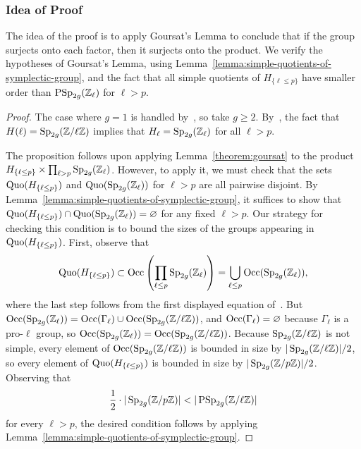 \subsubsection*{Idea of Proof}
The idea of the proof is to apply Goursat's Lemma to conclude that if the group surjects onto each factor,
then it surjects onto the product.
We verify the hypotheses of Goursat's Lemma,
using Lemma~\ref{lemma:simple-quotients-of-symplectic-group}, and the fact that all simple quotients of $H_{\{\ell \leq p\}}$
have smaller order than $\operatorname{PSp}_{2g}(\mathbb Z_\ell)$ for $\ell > p$.
	\begin{proof}
		The case where $g = 1$ is handled by~\cite[Lemma 7.6]{zywina2010hilbert}, so take $g \geq 2$. By~\cite[Theorem 1]{landesman-swaminathan-tao-xu:lifting-symplectic-group}, the fact that $H(\ell) = \operatorname{Sp}_{2g}(\mathbb Z/ \ell \mathbb Z)$ implies that $H_\ell = \operatorname{Sp}_{2g}(\mathbb Z_\ell)$ for all $\ell > p$.

  The proposition follows upon applying Lemma~\ref{theorem:goursat} to the product $H_{\{\ell \le p\}} \times \prod_{\ell > p} \operatorname{Sp}_{2g}(\mathbb Z_\ell)$. However, to apply it, we must check that the sets $\operatorname{Quo}(H_{\{\ell \le p\}})$ and $\operatorname{Quo}(\operatorname{Sp}_{2g}(\mathbb Z_\ell))$ for $\ell > p$ are all pairwise disjoint. By Lemma~\ref{lemma:simple-quotients-of-symplectic-group}, it suffices to show that $\operatorname{Quo}(H_{\{\ell \le p\}}) \cap \operatorname{Quo}(\operatorname{Sp}_{2g}(\mathbb Z_\ell)) = \varnothing$ for any fixed $\ell > p$. Our strategy for checking this condition is to bound the sizes of the groups appearing in $\operatorname{Quo}(H_{\{\ell \le p\}})$. First, observe that
		\[
			\operatorname{Quo}(H_{\{\ell \le p\}}) \subset \operatorname{Occ}\left( \prod_{\ell \le p} \operatorname{Sp}_{2g}({\mathbb Z}_\ell)\right) = \bigcup_{\ell \le p} \operatorname{Occ}(\operatorname{Sp}_{2g}({\mathbb Z}_\ell)),
		\]
		where the last step follows from the first displayed equation of~\cite[p.\ IV-25]{serre1989abelian}.
But
\(
			\operatorname{Occ}(\operatorname{Sp}_{2g}({\mathbb Z}_\ell)) = \operatorname{Occ}(\Gamma_\ell) \cup \operatorname{Occ}(\operatorname{Sp}_{2g}({\mathbb Z} / \ell \mathbb Z))
		\),
and $\operatorname{Occ}(\Gamma_\ell) = \varnothing$ because $\Gamma_\ell$ is a pro-$\ell$ group, so
		\(
			\operatorname{Occ}(\operatorname{Sp}_{2g}({\mathbb Z}_\ell)) = \operatorname{Occ}(\operatorname{Sp}_{2g}({\mathbb Z} / \ell \mathbb Z))
		\).
		Because $\operatorname{Sp}_{2g}({\mathbb Z} / \ell \mathbb Z)$ is not simple, every element of $\operatorname{Occ}(\operatorname{Sp}_{2g}({\mathbb Z} / \ell \mathbb Z))$ is bounded in size by $|\operatorname{Sp}_{2g}({\mathbb Z} / \ell \mathbb Z)| / 2$, so every element of $\operatorname{Quo}(H_{\{\ell \le p\}})$ is bounded in size by $|\operatorname{Sp}_{2g}({\mathbb Z} / p \mathbb Z)| / 2$. Observing that
		\[
			\frac{1}{2} \cdot |\operatorname{Sp}_{2g}({\mathbb Z} / p {\mathbb Z})| < |\operatorname{PSp}_{2g}({\mathbb Z} / \ell {\mathbb Z})|
		\]
		for every $\ell > p$, the desired condition follows by applying Lemma~\ref{lemma:simple-quotients-of-symplectic-group}.
	\end{proof}

